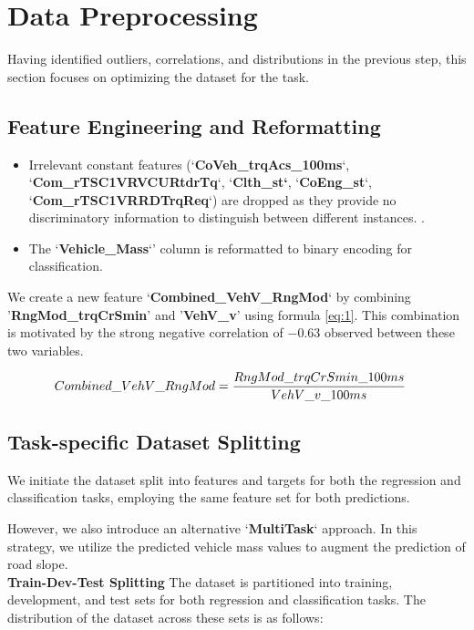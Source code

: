 \documentclass[conference]{IEEEtran}
\begin{document}
\section{Data Preprocessing}
Having identified outliers, correlations, and distributions in the previous step, this section focuses on optimizing the dataset for the task. 
\subsection{Feature Engineering and Reformatting}
\begin{itemize}
\item Irrelevant constant features (`\textbf{CoVeh\_trqAcs\_100ms}`, `\textbf{Com\_rTSC1VRVCURtdrTq}`, `\textbf{Clth\_st`}, `\textbf{CoEng\_st}`, `\textbf{Com\_rTSC1VRRDTrqReq}`) are dropped as they provide no discriminatory information to distinguish between different instances. . 

\item The `\textbf{Vehicle\_Mass}`' column is reformatted to binary encoding for classification.


\end{itemize}

We create a new feature `\textbf{Combined\_VehV\_RngMod}` by combining '\textbf{RngMod\_trqCrSmin}' and '\textbf{VehV\_v}' using formula \ref{eq:1}. This combination is motivated by the strong negative correlation of $-0.63$ observed between these two variables.

\begin{equation} \label{eq:1}
    \hspace{-1em} Combined\_VehV\_RngMod = \dfrac{RngMod\_trqCrSmin\_100ms}{VehV\_v\_100ms}
\end{equation}

\subsection{Task-specific Dataset Splitting}
We initiate the dataset split into features and targets for both the regression and classification tasks, employing the same feature set for both predictions. 

However, we also introduce an alternative `\textbf{MultiTask}` approach. In this strategy, we utilize the predicted vehicle mass values to augment the prediction of road slope. \\

\noindent \textbf{Train-Dev-Test Splitting} \hspace{0.2em} The dataset is partitioned into training, development, and test sets for both regression and classification tasks. The distribution of the dataset across these sets is as follows:
\end{document}
